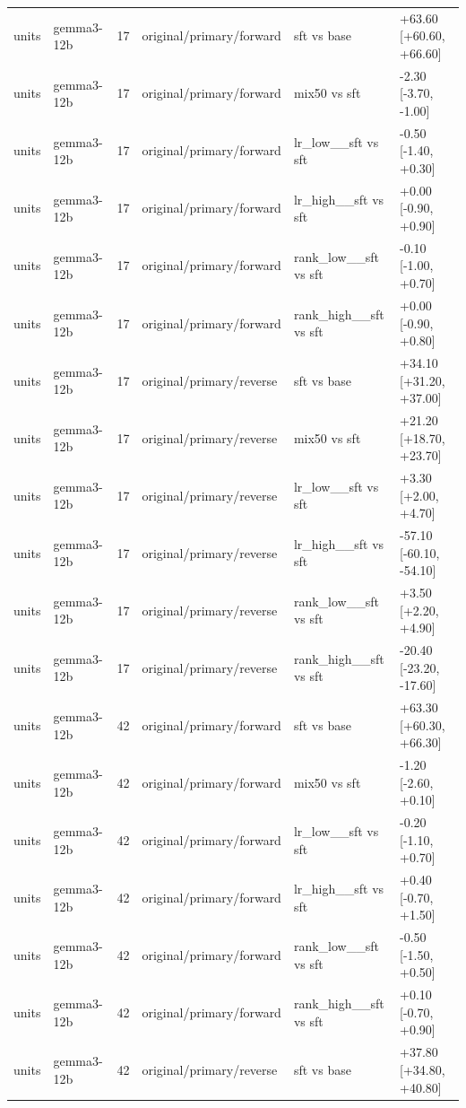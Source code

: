\begin{table}[t]
\begin{tabular}{llllll}
units & gemma3-12b & 17 & original/primary/forward & sft vs base & +63.60 [+60.60, +66.60] \\
units & gemma3-12b & 17 & original/primary/forward & mix50 vs sft & -2.30 [-3.70, -1.00] \\
units & gemma3-12b & 17 & original/primary/forward & lr\_low\_\_sft vs sft & -0.50 [-1.40, +0.30] \\
units & gemma3-12b & 17 & original/primary/forward & lr\_high\_\_sft vs sft & +0.00 [-0.90, +0.90] \\
units & gemma3-12b & 17 & original/primary/forward & rank\_low\_\_sft vs sft & -0.10 [-1.00, +0.70] \\
units & gemma3-12b & 17 & original/primary/forward & rank\_high\_\_sft vs sft & +0.00 [-0.90, +0.80] \\
units & gemma3-12b & 17 & original/primary/reverse & sft vs base & +34.10 [+31.20, +37.00] \\
units & gemma3-12b & 17 & original/primary/reverse & mix50 vs sft & +21.20 [+18.70, +23.70] \\
units & gemma3-12b & 17 & original/primary/reverse & lr\_low\_\_sft vs sft & +3.30 [+2.00, +4.70] \\
units & gemma3-12b & 17 & original/primary/reverse & lr\_high\_\_sft vs sft & -57.10 [-60.10, -54.10] \\
units & gemma3-12b & 17 & original/primary/reverse & rank\_low\_\_sft vs sft & +3.50 [+2.20, +4.90] \\
units & gemma3-12b & 17 & original/primary/reverse & rank\_high\_\_sft vs sft & -20.40 [-23.20, -17.60] \\
units & gemma3-12b & 42 & original/primary/forward & sft vs base & +63.30 [+60.30, +66.30] \\
units & gemma3-12b & 42 & original/primary/forward & mix50 vs sft & -1.20 [-2.60, +0.10] \\
units & gemma3-12b & 42 & original/primary/forward & lr\_low\_\_sft vs sft & -0.20 [-1.10, +0.70] \\
units & gemma3-12b & 42 & original/primary/forward & lr\_high\_\_sft vs sft & +0.40 [-0.70, +1.50] \\
units & gemma3-12b & 42 & original/primary/forward & rank\_low\_\_sft vs sft & -0.50 [-1.50, +0.50] \\
units & gemma3-12b & 42 & original/primary/forward & rank\_high\_\_sft vs sft & +0.10 [-0.70, +0.90] \\
units & gemma3-12b & 42 & original/primary/reverse & sft vs base & +37.80 [+34.80, +40.80] \\

\end{tabular}
\end{table}
